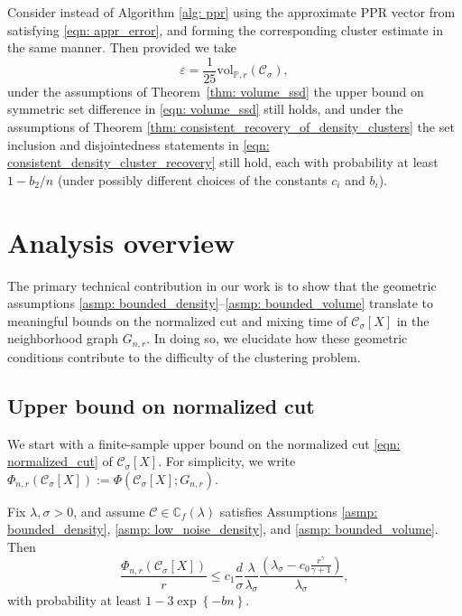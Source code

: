 \documentclass[11pt,twoside]{article}
\newcommand{\set}[1]{\left\{#1\right\}}
\newcommand{\vol}{\mathrm{vol}}
\newcommand{\1}{\mathbbm{1}}
\newcommand{\Xbf}{X}
\newcommand{\Pbb}{\mathbb{P}}
\newcommand{\Cbb}{\mathbb{C}}
\newcommand{\Cset}{\mathcal{C}}
\newcommand{\Csig}{\Cset_{\sigma}}
\newcommand{\Cest}{\widehat{C}}
\begin{document}
\begin{corollary}
  \label{cor: appr}
  Consider instead of
  Algorithm \ref{alg: ppr} using the approximate PPR vector from
  \citet{andersen2006} satisfying \eqref{eqn: appr_error}, and forming the 
  corresponding cluster estimate \smash{$\Cest$} in the same manner.  Then 
  provided we take 
  \begin{equation}
    \label{eqn: appr_parameter}
    \varepsilon = \frac{1}{25} \vol_{\Pbb,r}(\Csig),
  \end{equation}
  under the assumptions of Theorem~\ref{thm: volume_ssd} the upper bound on symmetric set difference in \eqref{eqn: volume_ssd} still
  holds, and under the assumptions of Theorem \ref{thm: consistent_recovery_of_density_clusters} the set inclusion and disjointedness statements in \eqref{eqn: consistent_density_cluster_recovery} still hold, each with probability at least $1 - b_2/n$ (under possibly different choices of the constants $c_i$ and $b_i$).
\end{corollary}

\section{Analysis overview}
\label{sec: analysis}

The primary technical contribution in our work is to show that the
geometric assumptions \ref{asmp: bounded_density}--\ref{asmp: bounded_volume} 
translate to  meaningful bounds on the normalized cut and mixing time of 
$\Csig[\Xbf]$ in the neighborhood graph $G_{n,r}$. In doing so, we elucidate 
how these geometric conditions contribute to the difficulty of the clustering 
problem.   

\subsection{Upper bound on normalized cut} 

We start with a finite-sample upper bound on the normalized cut \eqref{eqn:
  normalized_cut} of $\Cset_\sigma[\Xbf]$. For simplicity, we write
$\Phi_{n,r}(\Csig[\Xbf]) := \Phi(\Csig[\Xbf]; G_{n,r})$.  

\begin{theorem}
  \label{thm: conductance_upper_bound}
  Fix $\lambda,\sigma>0$, and assume $\Cset \in \Cbb_f(\lambda)$ satisfies    
  Assumptions \ref{asmp: bounded_density}, \ref{asmp: low_noise_density}, and   
  \ref{asmp: bounded_volume}. Then
  \begin{equation}
    \label{eqn: conductance_additive_error_bound}
    \frac{\Phi_{n,r}(\Csig[\Xbf])}{r} \leq c_1 \frac{d}{\sigma}
    \frac{\lambda}{\lambda_{\sigma}} \frac{(\lambda_{\sigma} -
      c_0\frac{r^{\gamma}}{\gamma+1})}{\lambda_{\sigma}},
  \end{equation}
  with probability at least $1 - 3\exp\set{-b n}$. 
\end{theorem}
\end{document}
